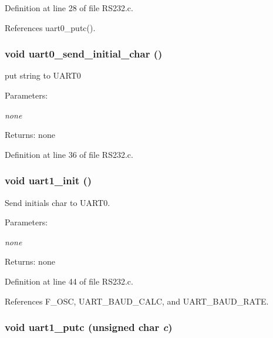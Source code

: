 Definition at line 28 of file RS232.c.

References uart0\_\-putc().
\subsubsection{\setlength{\rightskip}{0pt plus 5cm}void uart0\_\-send\_\-initial\_\-char ()}\label{_r_s232_8h_b0c760a24b8de71ee9b66479bf60ae9c}


put string to UART0 

\begin{Desc}
\item[Parameters:]
\begin{description}
\item[{\em none}]\end{description}
\end{Desc}
\begin{Desc}
\item[Returns:]none \end{Desc}


Definition at line 36 of file RS232.c.
\subsubsection{\setlength{\rightskip}{0pt plus 5cm}void uart1\_\-init ()}\label{_r_s232_8h_f59ed3d50cebafc783b6110df819ef40}


Send initials char to UART0. 

\begin{Desc}
\item[Parameters:]
\begin{description}
\item[{\em none}]\end{description}
\end{Desc}
\begin{Desc}
\item[Returns:]none \end{Desc}


Definition at line 44 of file RS232.c.

References F\_\-OSC, UART\_\-BAUD\_\-CALC, and UART\_\-BAUD\_\-RATE.
\subsubsection{\setlength{\rightskip}{0pt plus 5cm}void uart1\_\-putc (unsigned char {\em c})}\label{_r_s232_8h_e952b200b6a4d0d9e77daba1b63bd2da}



